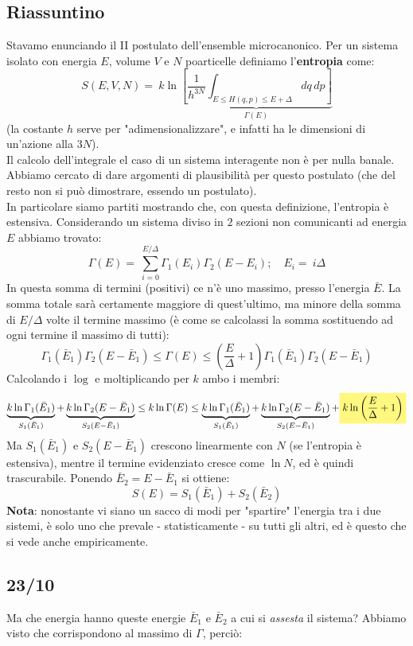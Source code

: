 \documentclass[12pt]{article}
\begin{document}
\subsection{Riassuntino}
Stavamo enunciando il II postulato dell'ensemble microcanonico. Per un sistema isolato con energia $E$, volume $V$ e $N$ poarticelle definiamo l'\textbf{entropia} come:
\[
S(E,V,N) =\ k\ln\underbrace{\left[\frac{1}{h^{3N}}\int_{E\leq H(q,p)\leq E+\Delta}dq\,dp\right]}_{\Gamma(E)}
\]
(la costante $h$ serve per "adimensionalizzare", e infatti ha le dimensioni di un'azione alla $3N$).\\
Il calcolo dell'integrale el caso di un sistema interagente non è per nulla banale.\\
Abbiamo cercato di dare argomenti di plausibilità per questo postulato (che del resto non si può dimostrare, essendo un postulato).\\
In particolare siamo partiti mostrando che, con questa definizione, l'entropia è estensiva. Considerando un sistema diviso in $2$ sezioni non comunicanti ad energia $E$ abbiamo trovato:
\[
\Gamma(E) =\ \sum_{i=0}^{E/\Delta} \Gamma_1(E_i)\Gamma_2(E-E_i); \quad E_i =\ i\Delta
\]
In questa somma di termini (positivi) ce n'è uno massimo, presso l'energia $\bar{E}$. La somma totale sarà certamente maggiore di quest'ultimo, ma minore della somma di $E/\Delta$ volte il termine massimo (è come se calcolassi la somma sostituendo ad ogni termine il massimo di tutti):
\[
\Gamma_1(\bar{E}_1)\Gamma_2(E-\bar{E}_1)\leq \Gamma(E)\leq \left(\frac{E}{\Delta}+1\right )\Gamma_1(\bar{E}_1)\Gamma_2(E-\bar{E}_1)
\]
Calcolando i $\log$ e moltiplicando per $k$ ambo i membri:
\[
\underbrace{k\ln\Gamma_1(\bar{E}_1)}_{S_1(\bar{E}_1)}+\underbrace{k\ln\Gamma_2(E-\bar{E}_1)}_{S_2(E-\bar{E}_1)}\leq k\ln\Gamma(E)\leq \underbrace{k\ln\Gamma_1(\bar{E}_1)}_{S_1(\bar{E}_1)}+\underbrace{k\ln\Gamma_2(E-\bar{E}_1)}_{S_2(E-\bar{E}_1)} + \hlc{Yellow}{k\ln\left(\frac{E}{\Delta}+1\right)}
\]
Ma $S_1(\bar{E}_1)$ e $S_2(E-\bar{E}_1)$ crescono linearmente con $N$ (se l'entropia è estensiva), mentre il termine evidenziato cresce come $\ln N$, ed è quindi trascurabile. Ponendo $\bar{E}_2 = E-\bar{E}_1$ si ottiene:
\[
S(E) = S_1(\bar{E}_1)+S_2(\bar{E}_2)
\]
\textbf{Nota}: nonostante vi siano un sacco di modi per "spartire" l'energia tra i due sistemi, è solo uno che prevale - statisticamente - su tutti gli altri, ed è questo che si vede anche empiricamente.\\

\subsection{23/10}
Ma che energia hanno queste energie $\bar{E}_1$ e $\bar{E}_2$ a cui si \textit{assesta} il sistema? Abbiamo visto che corrispondono al massimo di $\Gamma$, perciò:
\end{document}
